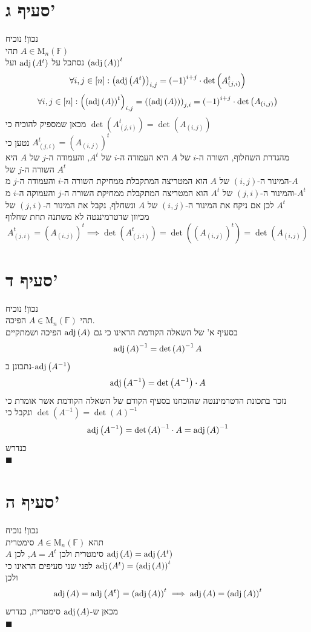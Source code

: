 \documentclass[12pt, titlepage]{article}
\begin{document}
\section*{סעיף ג'}
נכון! נוכיח\\
תהי $A\in\mathrm{M}_n\left(\mathbb{F}\right)$\\
נסתכל על $\mathrm{adj}\left(A^t\right)$ ועל $\left(\mathrm{adj}\left(A\right)\right)^t$
\[
   \forall i,j\in\left[n\right]:\left(\mathrm{adj}\left(A^t\right)\right)_{i,j} =  \left(-1\right)^{i+j} \cdot \det\left(A^t_{\left(j,i\right)}\right)
\]
\[
    \forall i,j\in\left[n\right]:\left(\left(\mathrm{adj}\left(A\right)\right)^t\right)_{i,j} = \left(\left(\mathrm{adj}\left(A\right)\right)\right)_{j,i} = \left(-1\right)^{i+j}\cdot \det\left(A_{\left(i,j\right)}\right)
\]
מכאן שמספיק להוכיח כי $\det\left(A^t_{\left(j,i\right)}\right)=\det\left(A_{\left(i,j\right)}\right)$\\
נטען כי $A^t_{\left(j,i\right)} = \left(A_{\left(i,j\right)}\right)^t$\\
מהגדרת השחלוף, השורה ה-$i$ של $A$ היא העמודה ה-$i$ של $A^t$, והעמודה ה-$j$ של $A$ היא השורה ה-$j$ של $A^t$\\
המינור ה-$\left(i,j\right)$ של $A$ הוא המטריצה המתקבלת ממחיקת השורה ה-$i$ והעמודה ה-$j$ מ-$A$\\
והמינור ה-$\left(j,i\right)$ של $A^t$ הוא המטריצה המתקבלת ממחיקת השורה ה-$j$ והעמוקה ה-$i$ מ-$A^t$\\
לכן אם ניקח את המינור ה-$\left(i,j\right)$ של $A$ ונשחלף, נקבל את המינור ה-$\left(j,i\right)$ של $A^t$ \\
מכיוון שדטרמיננטה לא משתנה תחת שחלוף
\[
    A^t_{\left(j,i\right)} = \left(A_{\left(i,j\right)}\right)^t \implies \det\left(A^t_{\left(j,i\right)}\right) = \det\left(\left(A_{\left(i,j\right)}\right)^t\right) = \det\left(A_{\left(i,j\right)}\right)
\]
\blacksquare
\section*{סעיף ד'}
נכון! נוכיח\\
תהי $A\in\mathrm{M}_n\left(\mathbb{F}\right)$ הפיכה.\\
בסעיף א' של השאלה הקודמת הראינו כי גם $\mathrm{adj}\left(A\right)$ הפיכה ושמתקיים
\[
    \mathrm{adj}\left(A\right)^{-1} = \det\left(A\right)^{-1}A
\]
נתבונן ב-$\mathrm{adj}\left(A^{-1}\right)$
\[
    \mathrm{adj}\left(A^{-1}\right) = \det\left(A^{-1}\right)\cdot A
\]
נזכר בתכונת הדטרמיננטה שהוכחנו בסעיף הקודם של השאלה הקודמת אשר אומרת כי $\det\left(A^{-1}\right)=\det\left(A\right)^{-1}$ ונקבל כי
\[
    \mathrm{adj}\left(A^{-1}\right) = \det\left(A\right)^{-1} \cdot A = \mathrm{adj}\left(A\right)^{-1}
\]
כנדרש\\
$\blacksquare$
\section*{סעיף ה'}
נכון! נוכיח\\
תהא $A\in\mathrm{M}_n\left(\mathbb{F}\right)$ סימטרית\\
$A$ סימטרית ולכן $A=A^t$, לכן $\mathrm{adj}\left(A\right)=\mathrm{adj}\left(A^t\right)$\\
לפני שני סעיפים הראינו כי $\mathrm{adj}\left(A^t\right) = \left(\mathrm{adj}\left(A\right)\right)^t$\\
ולכן
\[
    \mathrm{adj}\left(A\right) = \mathrm{adj}\left(A^t\right) = \left(\mathrm{adj}\left(A\right)\right)^t \implies \mathrm{adj}\left(A\right) = \left(\mathrm{adj}\left(A\right)\right)^t
\]
מכאן ש-$\mathrm{adj}\left(A\right)$ סימטרית, כנדרש\\
$\blacksquare$
\end{document}
